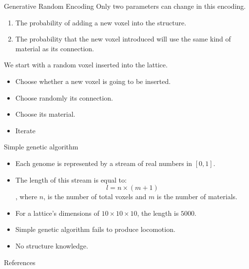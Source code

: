 \documentclass{beamer}
\begin{document}
\begin{frame}{Generative Random Encoding}
Only two parameters can change in this encoding.
\begin{enumerate}
\item The probability of adding a new voxel into the structure.
\item The probability that the new voxel introduced will use the same kind of material as its connection.
\end{enumerate}
We start with a random voxel inserted into the lattice.
\begin{itemize}
\item Choose whether a new voxel is going to be inserted.
\item Choose randomly its connection.
\item Choose its material.
\item Iterate
\end{itemize}
\end{frame}

\begin{frame}{Simple genetic algorithm}
\begin{itemize}
\item Each genome is represented by a stream of real numbers in $[ 0,1 ]$.
\item The length of this stream is equal to:
\begin{equation*}
l = n \times (m + 1)
\end{equation*}
, where $n$, is the number of total voxels and $m$ is the number of materials.
\item For a lattice's dimensions of $10 \times 10 \times 10$, the length is $5000$.
\item Simple genetic algorithm fails to produce locomotion.
\item No structure knowledge.
\end{itemize}
\end{frame}

\begin{frame}[allowframebreaks]{References}


\end{frame}
\end{document}
